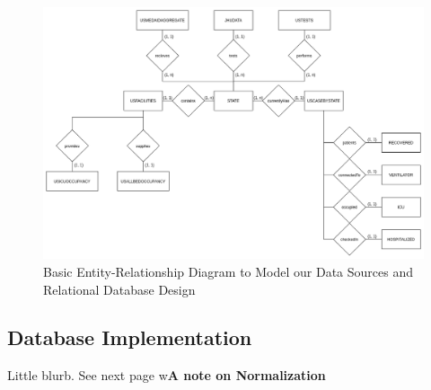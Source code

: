 \documentclass[11pt]{article}
\begin{document}
\FloatBarrier
\begin{figure}[h]
    \centering
    \includegraphics[width=\textwidth]{diagrams/ER1.png}
    \caption{Basic Entity-Relationship Diagram to Model our Data Sources and Relational Database Design}
    \label{fig:er1}
\end{figure}
\FloatBarrier

\subsection{Database Implementation}
\label{subsec:implementation}

\noindent
Little blurb. See next page w\textbf{A note on Normalization}

\pagebreak
\end{document}
